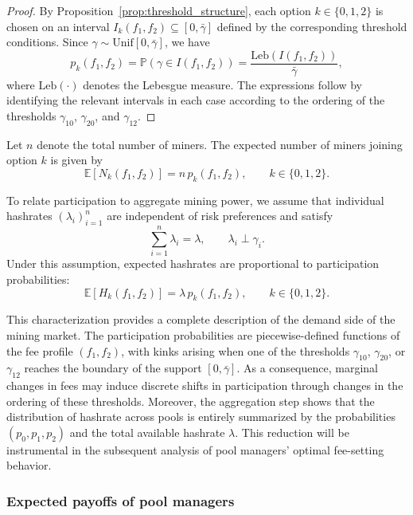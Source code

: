 \begin{proof}
By Proposition~\ref{prop:threshold_structure}, each option $k\in\{0,1,2\}$ is chosen 
on an interval $I_k(f_1,f_2)\subseteq[0,\bar{\gamma}]$ defined by the corresponding 
threshold conditions. Since $\gamma \sim \mathrm{Unif}[0,\bar{\gamma}]$, we have
\[
p_k(f_1,f_2)=\mathbb{P}(\gamma\in {I}(f_1,f_2))
=\frac{\mathrm{Leb}({I}(f_1,f_2))}{\bar{\gamma}},
\]
where $\mathrm{Leb}(\cdot)$ denotes the Lebesgue measure. The expressions follow 
by identifying the relevant intervals in each case according to the ordering of 
the thresholds $\gamma_{10}$, $\gamma_{20}$, and $\gamma_{12}$.
\end{proof}

Let $n$ denote the total number of miners. The expected number of miners joining 
option $k$ is given by
\begin{equation}
\mathbb{E}[N_k(f_1,f_2)]
=
n\,p_k(f_1,f_2),
\qquad k\in\{0,1,2\}.
\end{equation}

To relate participation to aggregate mining power, we assume that individual 
hashrates $(\lambda_i)_{i=1}^n$ are independent of risk preferences and satisfy
\begin{equation}
\sum_{i=1}^n \lambda_i = \lambda,
\qquad
\lambda_i \perp \gamma_i.
\end{equation}
Under this assumption, expected hashrates are proportional to participation probabilities:
\begin{equation}
\mathbb{E}[H_k(f_1,f_2)]
=
\lambda\,p_k(f_1,f_2),
\qquad k\in\{0,1,2\}.
\end{equation}

This characterization provides a complete description of the demand side of the 
mining market. The participation probabilities are piecewise-defined functions of 
the fee profile $(f_1,f_2)$, with kinks arising when one of the thresholds 
$\gamma_{10}$, $\gamma_{20}$, or $\gamma_{12}$ reaches the boundary of the support 
$[0,\bar{\gamma}]$. As a consequence, marginal changes in fees may induce discrete 
shifts in participation through changes in the ordering of these thresholds. Moreover, the aggregation step shows that the distribution of hashrate across pools is entirely summarized by the probabilities $(p_0,p_1,p_2)$ and the total available hashrate $\lambda$. This reduction will be instrumental in the subsequent analysis of pool managers' optimal fee-setting behavior.

\subsubsection{Expected payoffs of pool managers}

